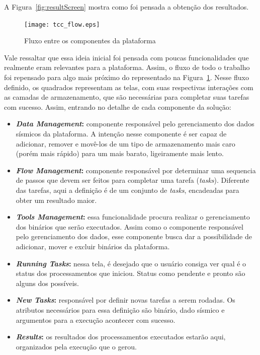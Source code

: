 \documentclass[11pt,twoside]{article}
\begin{document}
A Figura~\ref{fig:resultScreen} mostra como foi pensada a obtenção dos resultados.

\begin{figure}[!h]
  \centering
  \texttt{[image: tcc\_flow.eps]}
  \caption{Fluxo entre os componentes da plataforma}
  \label{fig:flowScreen}
\end{figure}

Vale ressaltar que essa ideia inicial foi pensada com poucas funcionalidades que realmente eram relevantes para a plataforma. Assim, o fluxo de todo o trabalho foi 
repensado para algo mais próximo do representado na Figura~\ref{fig:flowScreen}. Nesse fluxo definido, os quadrados representam as telas, com suas respectivas interações com 
as camadas de armazenamento, que são necessárias para completar suas tarefas com sucesso. Assim, entrando no detalhe de cada componente da solução:

\begin{itemize}
  \item \textbf{\emph{Data Management}:} componente responsável pelo gerenciamento dos dados sísmicos da plataforma. A intenção nesse componente é ser capaz de adicionar, remover e 
  movê-los de um tipo de armazenamento mais caro (porém mais rápido) para um mais barato, ligeiramente mais lento. 
  \item \textbf{\emph{Flow Management}:} componente responsável por determinar uma sequencia de passos que devem ser feitos para completar uma tarefa (\emph{tasks}). Diferente das tarefas,
  aqui a definição é de um conjunto de \emph{tasks}, encadeadas para obter um resultado maior.
  \item \textbf{\emph{Tools Management}:} essa funcionalidade procura realizar o gerenciamento dos binários que serão executados. Assim como o componente responsável pelo gerenciamento
  dos dados, esse componente busca dar a possibilidade de adicionar, mover e excluir binários da plataforma.
  \item \textbf{\emph{Running Tasks}:} nessa tela, é desejado que o usuário consiga ver qual é o status dos processamentos que iniciou. Status como pendente e pronto são alguns dos 
  possíveis.
  \item \textbf{\emph{New Tasks}:} responsável por definir novas tarefas a serem rodadas. Os atributos necessários para essa definição são binário, dado sísmico 
  e argumentos para a execução acontecer com sucesso. 
  \item \textbf{\emph{Results}:} os resultados dos processamentos executados estarão aqui, organizados pela execução que o gerou.
\end{itemize}
\end{document}
